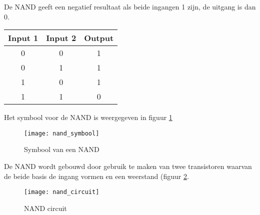 De NAND geeft een negatief resultaat als beide ingangen 1 zijn, de uitgang is dan 0.

\begin{tabular}{ |c|c|c| }
\hline
\rowcolor{gray!60}
	Input 1 & Input 2 & Output \\
	\hline
	0 & 0 & 1 \\
	\hline
	0 & 1 & 1 \\
	\hline
	1 & 0 & 1 \\
	\hline
	1 & 1 & 0 \\
	\hline
\end{tabular}

Het symbool voor de NAND is weergegeven in figuur \ref{symbool:nand}

\begin{figure}[h]
\texttt{[image: nand\_symbool]}
\centering
\caption{Symbool van een NAND}
\label{symbool:nand}
\end{figure}

De NAND wordt gebouwd door gebruik te maken van twee transistoren waarvan de beide basis de ingang vormen en een weerstand (figuur \ref{circuit:nand}.

\begin{figure}[h]
\texttt{[image: nand\_circuit]}
\centering
\caption{NAND circuit}
\label{circuit:nand}
\end{figure}

